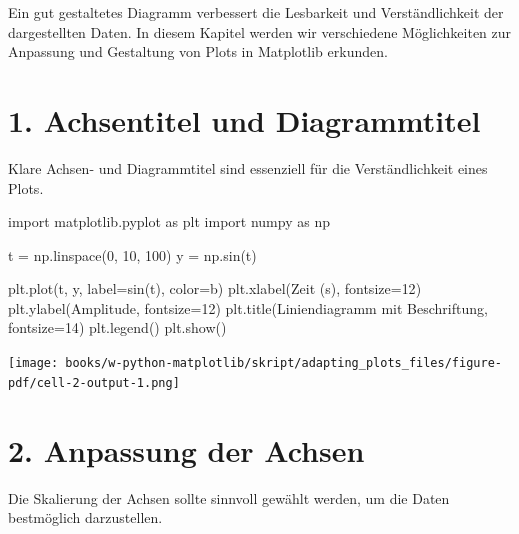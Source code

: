 \documentclass[
  letterpaper,
  DIV=11,
  numbers=noendperiod]{scrreprt}
\newenvironment{Shaded}{\begin{snugshade}}{\end{snugshade}}
\newcommand{\DecValTok}[1]{\textcolor[rgb]{0.68,0.00,0.00}{#1}}
\newcommand{\ImportTok}[1]{\textcolor[rgb]{0.00,0.46,0.62}{#1}}
\newcommand{\NormalTok}[1]{\textcolor[rgb]{0.00,0.23,0.31}{#1}}
\newcommand{\OperatorTok}[1]{\textcolor[rgb]{0.37,0.37,0.37}{#1}}
\newcommand{\StringTok}[1]{\textcolor[rgb]{0.13,0.47,0.30}{#1}}
\begin{document}
Ein gut gestaltetes Diagramm verbessert die Lesbarkeit und
Verständlichkeit der dargestellten Daten. In diesem Kapitel werden wir
verschiedene Möglichkeiten zur Anpassung und Gestaltung von Plots in
Matplotlib erkunden.

\section{1. Achsentitel und
Diagrammtitel}\label{achsentitel-und-diagrammtitel}

Klare Achsen- und Diagrammtitel sind essenziell für die Verständlichkeit
eines Plots.

\begin{Shaded}
\begin{Highlighting}[]
\ImportTok{import}\NormalTok{ matplotlib.pyplot }\ImportTok{as}\NormalTok{ plt}
\ImportTok{import}\NormalTok{ numpy }\ImportTok{as}\NormalTok{ np}

\NormalTok{t }\OperatorTok{=}\NormalTok{ np.linspace(}\DecValTok{0}\NormalTok{, }\DecValTok{10}\NormalTok{, }\DecValTok{100}\NormalTok{)}
\NormalTok{y }\OperatorTok{=}\NormalTok{ np.sin(t)}

\NormalTok{plt.plot(t, y, label}\OperatorTok{=}\StringTok{\textquotesingle{}sin(t)\textquotesingle{}}\NormalTok{, color}\OperatorTok{=}\StringTok{\textquotesingle{}b\textquotesingle{}}\NormalTok{)}
\NormalTok{plt.xlabel(}\StringTok{\textquotesingle{}Zeit (s)\textquotesingle{}}\NormalTok{, fontsize}\OperatorTok{=}\DecValTok{12}\NormalTok{)}
\NormalTok{plt.ylabel(}\StringTok{\textquotesingle{}Amplitude\textquotesingle{}}\NormalTok{, fontsize}\OperatorTok{=}\DecValTok{12}\NormalTok{)}
\NormalTok{plt.title(}\StringTok{\textquotesingle{}Liniendiagramm mit Beschriftung\textquotesingle{}}\NormalTok{, fontsize}\OperatorTok{=}\DecValTok{14}\NormalTok{)}
\NormalTok{plt.legend()}
\NormalTok{plt.show()}
\end{Highlighting}
\end{Shaded}

\texttt{[image: books/w-python-matplotlib/skript/adapting\_plots\_files/figure-pdf/cell-2-output-1.png]}

\section{2. Anpassung der Achsen}\label{anpassung-der-achsen}

Die Skalierung der Achsen sollte sinnvoll gewählt werden, um die Daten
bestmöglich darzustellen.
\end{document}

